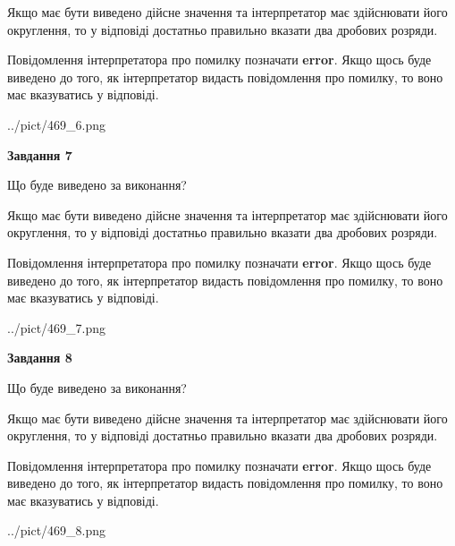 \documentclass[12pt, ukrainian]{article}
\begin{document}
{\begin {Large}
Якщо має бути виведено дійсне значення та інтерпретатор має здійснювати його округлення, 
то у відповіді достатньо правильно вказати два дробових розряди.

Повідомлення інтерпретатора про помилку позначати \textbf{error}.
Якщо щось буде виведено до того, як інтерпретатор видасть повідомлення про помилку, 
то воно має вказуватись у відповіді. \par

\begin{center}
	{../pict/469_6.png}
\end{center}
\newpage

{\begin {center}\textbf{Завдання 7}\end {center}}\par
Що буде виведено за виконання? \par

Якщо має бути виведено дійсне значення та інтерпретатор має здійснювати його округлення, 
то у відповіді достатньо правильно вказати два дробових розряди.

Повідомлення інтерпретатора про помилку позначати \textbf{error}.
Якщо щось буде виведено до того, як інтерпретатор видасть повідомлення про помилку, 
то воно має вказуватись у відповіді. \par

\begin{center}
	{../pict/469_7.png}
\end{center}
\newpage

{\begin {center}\textbf{Завдання 8}\end {center}}\par
Що буде виведено за виконання? \par

Якщо має бути виведено дійсне значення та інтерпретатор має здійснювати його округлення, 
то у відповіді достатньо правильно вказати два дробових розряди.

Повідомлення інтерпретатора про помилку позначати \textbf{error}.
Якщо щось буде виведено до того, як інтерпретатор видасть повідомлення про помилку, 
то воно має вказуватись у відповіді. \par

\begin{center}
	{../pict/469_8.png}
\end{center}
\newpage


\end{Large}}
\end{document}
